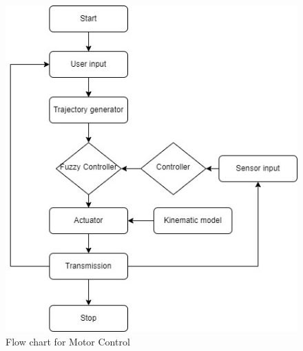 \begin{figure}[htbp]
\includegraphics[scale=0.9]{Figures/controller.jpg}
\centering
\caption[Flow chart for Motor Control] {Flow chart for Motor Control}
\label{fig:motorcontrol}
\end{figure}


